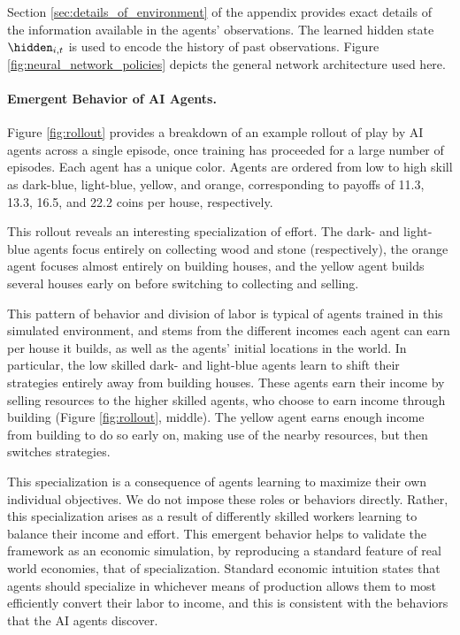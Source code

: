 Section \ref{sec:details_of_environment} of the appendix provides exact details of the information available in the agents' observations.
The learned hidden state $\hidden_{i,t}$ is used to encode the history of past observations.
Figure \ref{fig:neural_network_policies} depicts the general network architecture used here.


\paragraph{Emergent Behavior of AI Agents.}
Figure \ref{fig:rollout} provides a breakdown of an example rollout of play by AI agents across a single episode, once training has proceeded for a large number of episodes.
Each agent has a unique color. Agents are ordered from low to high skill as dark-blue, light-blue, yellow, and orange, corresponding to payoffs of 11.3, 13.3, 16.5, and 22.2 coins per house, respectively.

This rollout reveals an interesting specialization of effort.
The dark- and light-blue agents focus entirely on collecting wood and stone (respectively), the orange agent focuses almost entirely on building houses, and the yellow agent builds several houses early on before switching to collecting and selling.

This pattern of behavior and division of labor is typical of agents trained in this simulated environment, and stems from the different incomes each agent can earn per house it builds, as well as the agents' initial locations in the world.
In particular, the low skilled dark- and light-blue agents learn to shift their strategies entirely away from building houses.
These agents earn their income by selling resources to the higher skilled agents, who choose to earn income through building (Figure \ref{fig:rollout}, middle).
The yellow agent earns enough income from building to do so early on, making use of the nearby resources, but then switches strategies.

This specialization is a consequence of agents learning to maximize their own individual objectives.
We do not impose these roles or behaviors directly. Rather, this  specialization arises as a result of differently skilled workers learning to balance their income and effort.
This emergent behavior helps to validate the framework as an economic simulation, by reproducing a standard feature of real world economies, that of specialization.
Standard economic intuition states that agents should specialize in whichever means of production allows them to most efficiently convert their labor to income, and this is consistent with the behaviors that the AI agents discover.


